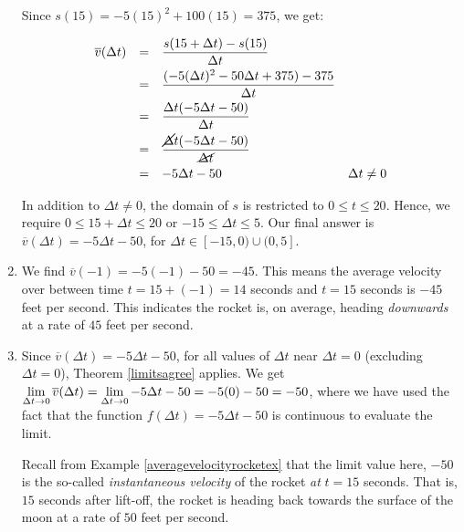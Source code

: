 \documentclass{ximera}
\begin{document}
\begin{example}
\begin{enumerate}
Since $s(15) = -5(15)^2 + 100(15) = 375$, we get:

\[ \begin{array}{rclr}

\overline{v}(\Delta t)& = & \dfrac{s(15+ \Delta t) - s(15)}{\Delta t} & \\ [7pt]
	                        & = & \dfrac{(-5(\Delta t)^2-50 \Delta t + 375) - 375}{\Delta t} & \\ [7pt]
	                        & = & \dfrac{\Delta t (-5 \Delta t - 50)}{\Delta t} & \\ [7pt]
	                         & = & \dfrac{\cancel{\Delta} t (-5 \Delta t - 50)}{\cancel{\Delta t}} & \\ [7pt]
	                         & = & -5 \Delta t - 50 & \text{$\Delta t \neq 0$} \\ \end{array} \]

In addition to $\Delta t \neq 0$,  the domain of $s$ is restricted to $0 \leq t \leq 20$.  Hence, we require  $0 \leq 15 + \Delta t \leq 20$ or  $-15 \leq \Delta t \leq 5$.  Our final answer is $\overline{v}(\Delta t) = -5 \Delta t - 50$, for $\Delta t \in [-15, 0) \cup (0, 5]$.



\item  We find  $\overline{v}(-1) = -5(-1) - 50 = -45$.  This means the average velocity over between time $t=15+(-1) = 14$ seconds and $t=15$ seconds is $-45$ feet per second.  This indicates the rocket is, on average, heading \textit{downwards} at a rate of $45$ feet per second.



\item  Since $\overline{v}(\Delta t) = -5 \Delta t - 50$, for all values of $\Delta t$ near $\Delta t = 0$ (excluding $\Delta t = 0$),  Theorem \ref{limitsagree} applies.  We get   $\ds{\lim_{\Delta t \rightarrow 0}  \overline{v}(\Delta t) = \lim_{\Delta t \rightarrow 0}  -5 \Delta t - 50 = -5(0) - 50 = -50}$, where we have used the fact that the function $f(\Delta t) = -5 \Delta t - 50$ is continuous to evaluate the limit.



Recall from Example \ref{averagevelocityrocketex} that the limit value here, $-50$  is the so-called \textit{instantaneous velocity} of the rocket \textit{at} $t=15$ seconds.  That is, $15$ seconds after lift-off, the rocket is heading back towards the surface of the moon at a rate of $50$ feet per second. 




\end{enumerate}
\end{example}
\end{document}
